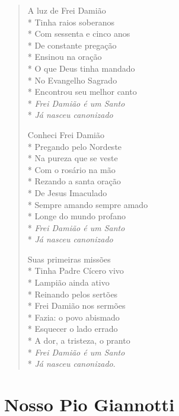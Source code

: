 \begin{verse}
A luz de Frei Damião\\*
Tinha raios soberanos\\*
Com sessenta e cinco anos\\*
De constante pregação\\*
Ensinou na oração\\*
O que Deus tinha mandado\\*
No Evangelho Sagrado\\*
Encontrou seu melhor canto\\*
\textit{Frei Damião é um Santo}\\*
\textit{Já nasceu canonizado}

Conheci Frei Damião\\*
Pregando pelo Nordeste\\*
Na pureza que se veste\\*
Com o rosário na mão\\*
Rezando a santa oração\\*
De Jesus Imaculado\\*
Sempre amando sempre amado\\*
Longe do mundo profano\\*
\textit{Frei Damião é um Santo}\\*
\textit{Já nasceu canonizado}

Suas primeiras missões\\*
Tinha Padre Cícero vivo\\*
Lampião ainda ativo\\*
Reinando pelos sertões\\*
Frei Damião nos sermões\\*
Fazia: o povo abismado\\*
Esquecer o lado errado\\*
A dor, a tristeza, o pranto\\*
\textit{Frei Damião é um Santo}\\*
\textit{Já nasceu canonizado}.
\end{verse}


\chapter{Nosso Pio Giannotti}

